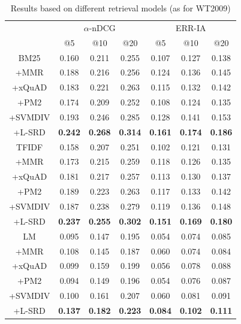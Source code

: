 \documentclass[review]{elsarticle}
\begin{document}
\begin{table}[htb]
\centering
\begin{tabular}{|c|c|c|c|c|c|c|}
\hline
& \multicolumn{3}{c}{$\alpha$-nDCG} & \multicolumn{3}{|c|}{ERR-IA}\\
\cline{2-7}
& @5 & @10 & @20 & @5 & @10 & @20\\
\hline
BM25     & 0.160          & 0.211          & 0.255          & 0.107          & 0.127          & 0.138\\
+MMR     & 0.188          & 0.216          & 0.256          & 0.124          & 0.136          & 0.145\\
+xQuAD   & 0.183          & 0.221          & 0.263          & 0.115          & 0.132          & 0.142\\
+PM2     & 0.174          & 0.209          & 0.252          & 0.108          & 0.124          & 0.135\\
+SVMDIV  & 0.193          & 0.246          & 0.285          & 0.128          & 0.141          & 0.153\\
+L-SRD & \textbf{0.242} & \textbf{0.268} & \textbf{0.314} & \textbf{0.161} & \textbf{0.174} & \textbf{0.186}\\
\hline
TFIDF    & 0.158          & 0.207          & 0.251          & 0.102          & 0.121          & 0.131\\
+MMR     & 0.173          & 0.215          & 0.259          & 0.118          & 0.126          & 0.135\\
+xQuAD   & 0.181          & 0.217          & 0.257          & 0.113          & 0.130          & 0.137\\
+PM2     & 0.189          & 0.223          & 0.263          & 0.117          & 0.133          & 0.142\\
+SVMDIV  & 0.187          & 0.238          & 0.279          & 0.119          & 0.136          & 0.148\\
+L-SRD & \textbf{0.237} & \textbf{0.255} & \textbf{0.302} & \textbf{0.151} & \textbf{0.169} & \textbf{0.180}\\
\hline
LM       & 0.095          & 0.147          & 0.195          & 0.054          & 0.074          & 0.085\\
+MMR     & 0.108          & 0.145          & 0.187          & 0.060          & 0.074          & 0.084\\
+xQuAD   & 0.099          & 0.159          & 0.199          & 0.056          & 0.078          & 0.088\\
+PM2     & 0.094          & 0.149          & 0.196          & 0.054          & 0.076          & 0.087\\
+SVMDIV  & 0.100          & 0.161          & 0.207          & 0.060          & 0.081          & 0.091\\
+L-SRD & \textbf{0.137} & \textbf{0.182} & \textbf{0.223} & \textbf{0.084} & \textbf{0.102} & \textbf{0.111}\\
\hline
\end{tabular}
\caption{Results based on different retrieval models (as for WT2009)}
\label{tab4}
\end{table}
\end{document}
